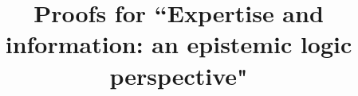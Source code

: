 \documentclass[sn-apa]{sn-jnl}%
\theoremstyle{thmstyleone}%
\theoremstyle{thmstyletwo}%
\theoremstyle{thmstylethree}%
\begin{document}
\newcommand{\appendixtitle}{Proofs for ``Expertise and information: an epistemic logic perspective"}
\title[\appendixtitle]{\appendixtitle}

\author[1]{ }

\maketitle

\begin{appendices}
    
\end{appendices}

%
\end{document}
